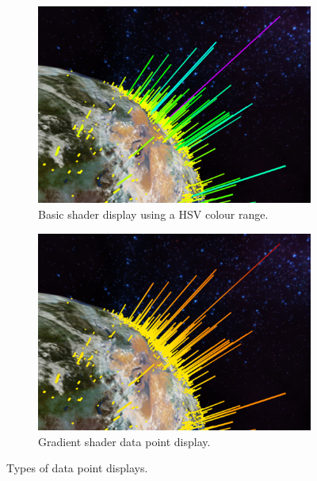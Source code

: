 
\begin{figure}[H]
	\newcommand{\figurewidth}{0.5\textwidth}
	\begin{subfigure}[b]{\figurewidth}
		\centering
        \includegraphics[width=\textwidth]{images/implementation/data_display/basic}
		\caption{Basic shader display using a HSV colour range.}
		\label{fig:basic_shader}
	\end{subfigure}
	\begin{subfigure}[b]{\figurewidth}
		\centering
		\includegraphics[width=\textwidth]{images/implementation/data_display/gradient}
		\caption{Gradient shader data point display.}
		\label{fig:gradient_shader}
	\end{subfigure}
	\caption[Data point display types]{Types of data point displays.}
	\label{fig:data_point_displays}
\end{figure}
